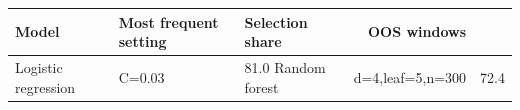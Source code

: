 \begin{tabular}{lllr}
\toprule
Model & Most frequent setting & Selection share & OOS windows \\
\midrule
Logistic regression & C=0.03 & 81.0%
Random forest & d=4,leaf=5,n=300 & 72.4%
\bottomrule
\end{tabular}
